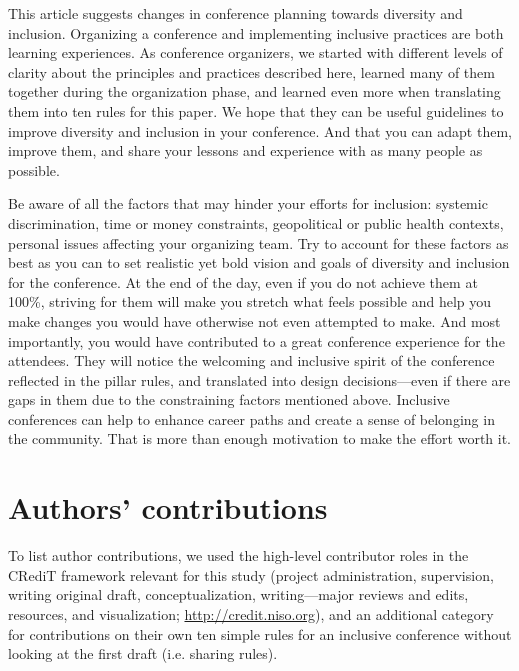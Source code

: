 \documentclass[10pt,letterpaper]{article}
\begin{document}
This article suggests changes in conference planning towards diversity and inclusion. 
Organizing a conference and implementing inclusive practices are both learning experiences.
As conference organizers, we started with different levels of clarity about the principles and practices described here, learned many of them together during the organization phase, and learned even more when translating them into ten rules for this paper. 
We hope that they can be useful guidelines to improve diversity and inclusion in your conference.  
And that you can adapt them, improve them, and share your lessons and experience with as many people as possible. 

Be aware of all the factors that may hinder your efforts for inclusion: systemic discrimination, time or money constraints, geopolitical or public health contexts, personal issues affecting your organizing team. 
Try to account for these factors as best as you can to set realistic yet bold vision and goals of diversity and inclusion for the conference.
At the end of the day, even if you do not achieve them at 100\%, striving for them will make you stretch what feels possible and help you make changes you would have otherwise not even attempted to make. 
And most importantly, you would have contributed to a great conference experience for the attendees. 
They will notice the welcoming and inclusive spirit of the conference reflected in the pillar rules, and translated into design decisions—even if there are gaps in them due to the constraining factors mentioned above. 
Inclusive conferences can help to enhance career paths and create a sense of belonging in the community. 
That is more than enough motivation to make the effort worth it. 


\section*{Authors' contributions}

To list author contributions, we used the high-level contributor roles in the CRediT framework relevant for this study (project administration, supervision, writing original draft, conceptualization, writing—major reviews and edits, resources, and visualization; \url{http://credit.niso.org}), and an additional category for contributions on their own ten simple rules for an inclusive conference without looking at the first draft (i.e. sharing rules).
\end{document}
